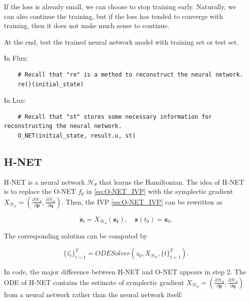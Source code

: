 \documentclass[
	parskip, 			   %
	twoside, 			   %
	DIV=14, 			   %
	BCOR=15.0mm, 		   %
	headsepline, 		   %
	open=right, 		   %
	captions=tableheading, %
	bibliography=totoc,    %
	numbers=noenddot       %
]{scrreprt}
\begin{document}
If the loss is already small, we can choose to stop training early. Naturally, we can also continue the training, but if the loss has tended to converge with training, then it does not make much sense to continue.

At the end, test the trained neural network model with training set or test set.

In Flux:
\begin{verbatim}
    # Recall that "re" is a method to reconstruct the neural network.
    re()(initial_state)
\end{verbatim}

In Lux:
\begin{verbatim}
    # Recall that "st" stores some necessary information for reconstructing the neural network.
    O_NET(initial_state, result.u, st)
\end{verbatim}


\subsection{H-NET}
H-NET is a neural network $\mathcal{H}_{\theta}$ that learns the Hamiltonian. The idea of H-NET is to replace the O-NET $f_{\theta}$ in \ref{eq:O-NET_IVP} with the symplectic gradient $X_{\mathcal{H}_{\theta}}=(\frac{\partial \mathcal{H}_{\theta}}{\partial \mathbf{p}}, \frac{\partial \mathcal{H}_{\theta}}{\partial \mathbf{q}})$. Then, the IVP \ref{eq:O-NET_IVP} can be rewritten as

\begin{equation}
    \label{eq:H-NET_IVP}
    \dot{\mathbf{z}}_t = X_{\mathcal{H}_{\theta}}(\mathbf{z_t}), \quad \mathbf{z}(t_{0}) = \mathbf{z}_{0}.
\end{equation}

The corresponding solution can be computed by

\begin{equation}
    \label{eq:H-NET_ODESolver}
    \{ \hat{z_{t}} \}_{t=1}^{T} = ODESolver(z_{0}, X_{\mathcal{H}_{\theta}}, \{ t \}_{t=1}^{T}).
\end{equation}

In code, the major difference between H-NET and O-NET appears in step 2. The ODE of H-NET contains the estimate of symplectic gradient $X_{\mathcal{H}_{\theta}}=(\frac{\partial \mathcal{H}_{\theta}}{\partial \mathbf{p}}, \frac{\partial \mathcal{H}_{\theta}}{\partial \mathbf{q}})$ from a neural network rather than the neural network itself:
\end{document}
